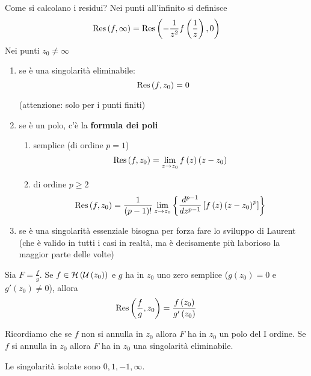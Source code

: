\begin{rem}
Come si calcolano i residui?
Nei punti all'infinito si definisce
\begin{equation*}
\operatorname{Res} \left(f,\infty \right) = \operatorname{Res} \left(- \frac{1}{z^{2}} f\left(\frac{1}{z}\right) ,0\right)
\end{equation*}
Nei punti $z_{0} \neq \infty $
\begin{enumerate}
\item se è una singolarità eliminabile:\begin{equation*}
\operatorname{Res} \left(f,z_{0}\right) = 0
\end{equation*}

(attenzione: solo per i punti finiti)
\item se è un polo, c'è la \textbf{formula dei poli}
\begin{enumerate}
\item semplice (di ordine $p = 1$)\begin{equation*}
\operatorname{Res} \left(f,z_{0}\right) = \lim\limits _{z\rightarrow z_{0}} f\left(z\right)\left(z - z_{0}\right)
\end{equation*}
\item di ordine $p\geq 2$\begin{equation*}
\operatorname{Res} \left(f,z_{0}\right) = \frac{1}{\left(p - 1\right) !}\lim\limits _{z\rightarrow z_{0}}\left\{\frac{d^{p - 1}}{dz^{p - 1}}\left[ f\left(z\right)\left(z - z_{0}\right)^{p}\right]\right\}
\end{equation*}
\end{enumerate}
\item se è una singolarità essenziale bisogna per forza fare lo sviluppo di Laurent (che è valido in tutti i casi in realtà, ma è decisamente più laborioso la maggior parte delle volte)
\end{enumerate}
\end{rem}
\begin{thm}
Sia $F = \frac{f}{g}$. Se $f\in \mathcal{H} \left(\mathcal{U} \left(z_{0}\right)\right)$ e $g$ ha in $z_{0}$ uno zero semplice ($g\left(z_{0}\right) = 0$ e $g'\left(z_{0}\right) \neq 0$), allora\begin{equation*}
\operatorname{Res} \left(\frac{f}{g} ,z_{0}\right) = \frac{f\left(z_{0}\right)}{g'\left(z_{0}\right)}
\end{equation*}

Ricordiamo che se $f$ non si annulla in $z_{0}$ allora $F$ ha in $z_{0}$ un polo del I ordine. Se $f$ si annulla in $z_{0}$ allora $F$ ha in $z_{0}$ una singolarità eliminabile.
\end{thm}
Le singolarità isolate sono $0,1, - 1,\infty $.

